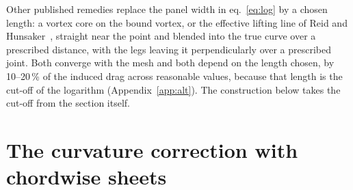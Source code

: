 \documentclass[11pt,a4paper]{article}
\begin{document}
Other published remedies replace the panel width in eq.~\eqref{eq:log} by a chosen length: a vortex core on the bound vortex, or the effective lifting line of Reid and Hunsaker~\cite{reid2020,goates2023}, straight near the point and blended into the true curve over a prescribed distance, with the legs leaving it perpendicularly over a prescribed joint. Both converge with the mesh and both depend on the length chosen, by 10--20\,\% of the induced drag across reasonable values, because that length is the cut-off of the logarithm (Appendix~\ref{app:alt}). The construction below takes the cut-off from the section itself.

\section{The curvature correction with chordwise sheets}
\label{sec:fix}
\end{document}
